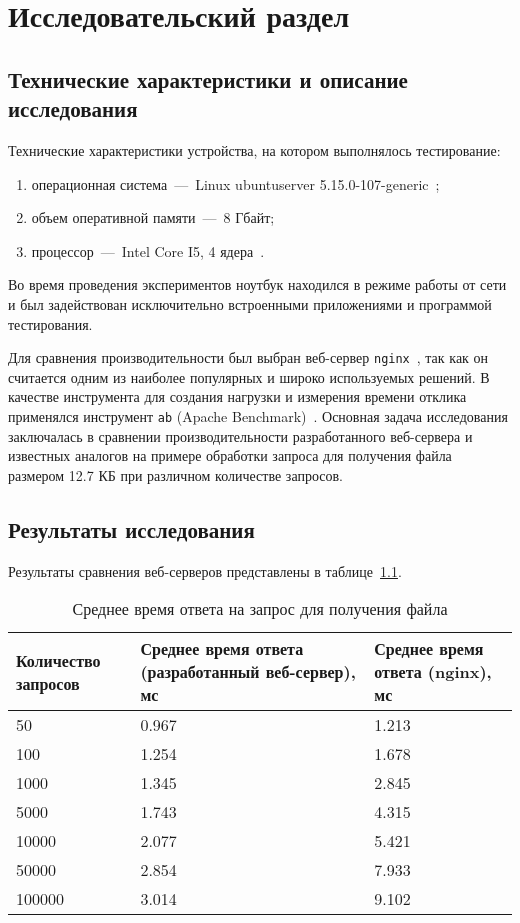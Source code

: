 \chapter{Исследовательский раздел}

\section{Технические характеристики и описание исследования}

Технические характеристики устройства, на котором выполнялось тестирование:
\begin{enumerate}
	\item операционная система~---~Linux ubuntuserver 5.15.0-107-generic~\cite{linux_ubuntu}; 
	\item объем оперативной памяти~---~8 Гбайт;
	\item процессор~---~Intel Core I5, 4 ядера~\cite{intel}.
\end{enumerate}

Во время проведения экспериментов ноутбук находился в режиме работы от сети и был задействован исключительно встроенными приложениями и программой тестирования.

Для сравнения производительности был выбран веб-сервер \texttt{nginx}~\cite{nginx}, так как он считается одним из наиболее популярных и широко используемых решений.  
В качестве инструмента для создания нагрузки и измерения времени отклика применялся инструмент \texttt{ab} (Apache Benchmark)~\cite{apache_benchmark}.  
Основная задача исследования заключалась в сравнении производительности разработанного веб-сервера и известных аналогов на примере обработки запроса для получения файла размером 12.7 КБ при различном количестве запросов.

\clearpage
\section{Результаты исследования}

Результаты сравнения веб-серверов представлены в таблице~\ref{table1}.
\begin{table}[!ht]
	\centering
	\caption{Среднее время ответа на запрос для получения файла}
	\label{table1}
	\begin{tabularx}{\textwidth}{|X|X|X|}
		\hline
		Количество запросов & Среднее время ответа (разработанный веб-сервер), мс & Среднее время ответа (nginx), мс \\ \hline
		50 & 0.967 & 1.213 \\ \hline
		100 & 1.254 & 1.678 \\ \hline
		1000 & 1.345 & 2.845 \\ \hline
		5000 & 1.743 & 4.315 \\ \hline
		10000 & 2.077 & 5.421 \\ \hline
		50000 & 2.854 & 7.933 \\ \hline
		100000 & 3.014 & 9.102 \\ \hline
	\end{tabularx}
\end{table}

